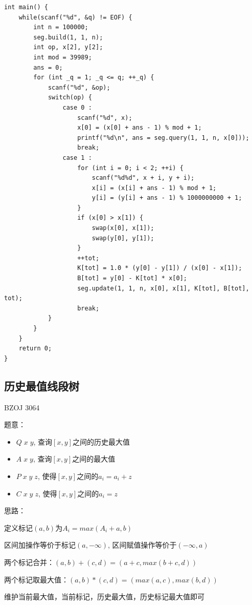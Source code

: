 \begin{lstlisting}
int main() {
	while(scanf("%d", &q) != EOF) {
		int n = 100000;
		seg.build(1, 1, n);
		int op, x[2], y[2];
		int mod = 39989;
		ans = 0;
		for (int _q = 1; _q <= q; ++_q) {
			scanf("%d", &op);
			switch(op) {
				case 0 :
					scanf("%d", x);
					x[0] = (x[0] + ans - 1) % mod + 1;
					printf("%d\n", ans = seg.query(1, 1, n, x[0]));
					break;
				case 1 :
					for (int i = 0; i < 2; ++i) {
						scanf("%d%d", x + i, y + i);
						x[i] = (x[i] + ans - 1) % mod + 1;
						y[i] = (y[i] + ans - 1) % 1000000000 + 1;
					}
					if (x[0] > x[1]) {
						swap(x[0], x[1]);
						swap(y[0], y[1]);
					}
					++tot;
					K[tot] = 1.0 * (y[0] - y[1]) / (x[0] - x[1]);
					B[tot] = y[0] - K[tot] * x[0];
					seg.update(1, 1, n, x[0], x[1], K[tot], B[tot], tot);
					break;
			}
		}
	} 
	return 0;
}
\end{lstlisting}


\subsection{历史最值线段树}

BZOJ 3064\par
题意：\par
\begin{itemize}
\item $Q\;x\;y$, 查询$[x, y]$之间的历史最大值
\item $A\;x\;y$, 查询$[x, y]$之间的最大值
\item $P\;x\;y\;z$, 使得$[x, y]$之间的$a_i = a_i + z$
\item $C\;x\;y\;z$, 使得$[x, y]$之间的$a_i = z$
\end{itemize}

思路：\par
定义标记$(a, b)$为$A_i = max(A_i + a, b)$\par
区间加操作等价于标记$(a, -\infty)$, 区间赋值操作等价于$(-\infty, a)$\par
两个标记合并：$(a, b) + (c, d) = (a + c, max(b + c, d))$\par
两个标记取最大值：$(a, b) * (c, d) = (max(a, c), max(b, d))$\par

维护当前最大值，当前标记，历史最大值，历史标记最大值即可\par

